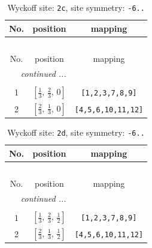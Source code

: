 \documentclass[fleqn,8pt]{jsarticle}
\begin{document}
\begin{longtable}{ccc}
\caption{Wyckoff site: {\tt 2c}, site symmetry: {\tt -6..}}
 \\
 \hline \hline
No. & position & mapping \\ \hline \endfirsthead

\multicolumn{2}{l}{\tablename\ \thetable{}} \\
 \hline \hline
No. & position & mapping \\ \hline \endhead

 \hline \hline
\multicolumn{2}{r}{\footnotesize\it continued ...} \\ \endfoot

 \hline \hline
\multicolumn{2}{r}{} \\ \endlastfoot

1 & $\left[ \frac{1}{3},\, \frac{2}{3},\, 0 \right]$ & {\tt [1,2,3,7,8,9]} \\ \hline
2 & $\left[ \frac{2}{3},\, \frac{1}{3},\, 0 \right]$ & {\tt [4,5,6,10,11,12]} \\
\end{longtable}
\renewcommand{\arraystretch}{1.2}
\begin{longtable}{ccc}
\caption{Wyckoff site: {\tt 2d}, site symmetry: {\tt -6..}}
 \\
 \hline \hline
No. & position & mapping \\ \hline \endfirsthead

\multicolumn{2}{l}{\tablename\ \thetable{}} \\
 \hline \hline
No. & position & mapping \\ \hline \endhead

 \hline \hline
\multicolumn{2}{r}{\footnotesize\it continued ...} \\ \endfoot

 \hline \hline
\multicolumn{2}{r}{} \\ \endlastfoot

1 & $\left[ \frac{1}{3},\, \frac{2}{3},\, \frac{1}{2} \right]$ & {\tt [1,2,3,7,8,9]} \\ \hline
2 & $\left[ \frac{2}{3},\, \frac{1}{3},\, \frac{1}{2} \right]$ & {\tt [4,5,6,10,11,12]} \\
\end{longtable}
\renewcommand{\arraystretch}{1.2}
\end{document}
